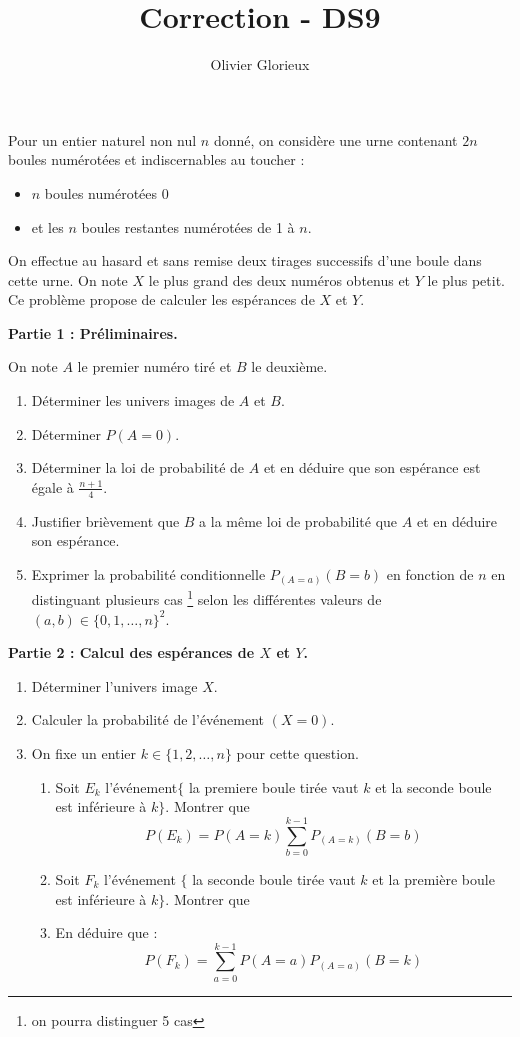 \documentclass[a4paper, 11pt,reqno]{article}
\author{Olivier Glorieux}
\begin{document}
\title{Correction - DS9}

\begin{exercice}

Pour un entier naturel non nul $n$ donné, on considère une urne contenant $2 n$ boules numérotées et indiscernables au toucher :
\begin{itemize}
\item  $n$ boules numérotées 0
\item  et les $n$ boules restantes numérotées de 1 à $n$.
\end{itemize}

On effectue au hasard et sans remise deux tirages successifs d'une boule dans cette urne. On note $X$ le plus grand des deux numéros obtenus et $Y$ le plus petit. Ce problème propose de  calculer les espérances de $X$ et $Y$.

\textbf{Partie 1 : Préliminaires. }

On note $A$ le premier numéro tiré et $B$ le deuxième.
\begin{enumerate}
\item Déterminer les univers images de $A$ et $B$.
\item Déterminer $P(A=0)$.
\item Déterminer la loi de probabilité de $A$ et en déduire que son espérance est égale à $\frac{n+1}{4}$.
\item  Justifier brièvement que $B$ a la même loi de probabilité que $A$ et en déduire son espérance.
\item  Exprimer la probabilité conditionnelle $P_{(A=a)}(B=b)$ en fonction de $n$ en distinguant plusieurs cas \footnote{on pourra distinguer 5 cas} selon les différentes valeurs de $(a, b) \in\{0,1, \ldots, n\}^2$.
\end{enumerate}

\textbf{Partie 2 : Calcul des espérances de $X$ et $Y$.}
\begin{enumerate}
\item  Déterminer l'univers image $X$.
\item Calculer la probabilité de l'événement $(X=0)$.
\item  On fixe un entier $k \in\{1,2, \ldots, n\}$ pour cette question.
\begin{enumerate}
\item Soit $E_k$ l'événement$ \{$ la premiere boule tirée vaut $k$ et la seconde boule est inférieure à $k\}$. Montrer  que 
$$P(E_k) =P(A=k) \sum_{b=0}^{k-1} P_{(A=k)}(B=b)$$

\item Soit $F_k $ l'événement $\{$ la seconde boule tirée vaut $k$ et la première boule est inférieure à $k\}$. Montrer  que 
\item En déduire que :
$$P(F_k)=\sum_{a=0}^{k-1} P(A=a) P_{(A=a)}(B=k) $$


\end{enumerate}
\end{enumerate}
\end{exercice}
\end{document}
